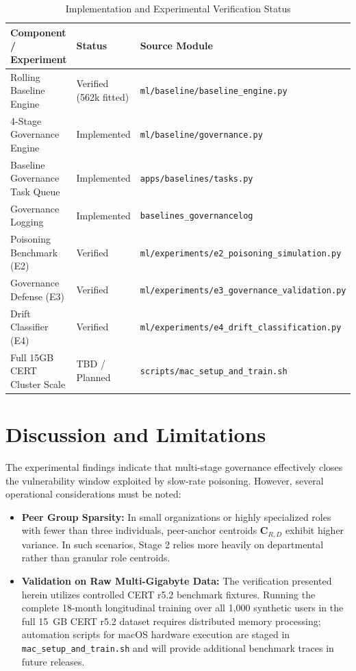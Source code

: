 \documentclass[conference]{IEEEtran}
\begin{document}
\begin{table}[htbp]
\caption{Implementation and Experimental Verification Status}
\label{tab:implementation_status}
\centering
\begin{tabular}{lll}
\toprule
\textbf{Component / Experiment} & \textbf{Status} & \textbf{Source Module} \\
\midrule
Rolling Baseline Engine & Verified (562k fitted) & \texttt{ml/baseline/baseline\_engine.py} \\
4-Stage Governance Engine & Implemented & \texttt{ml/baseline/governance.py} \\
Baseline Governance Task Queue & Implemented & \texttt{apps/baselines/tasks.py} \\
Governance Logging & Implemented & \texttt{baselines\_governancelog} \\
Poisoning Benchmark (E2) & Verified & \texttt{ml/experiments/e2\_poisoning\_simulation.py} \\
Governance Defense (E3) & Verified & \texttt{ml/experiments/e3\_governance\_validation.py} \\
Drift Classifier (E4) & Verified & \texttt{ml/experiments/e4\_drift\_classification.py} \\
Full 15GB CERT Cluster Scale & TBD / Planned & \texttt{scripts/mac\_setup\_and\_train.sh} \\
\bottomrule
\end{tabular}
\end{table}

\section{Discussion and Limitations}
\label{sec:discussion}
The experimental findings indicate that multi-stage governance effectively closes the vulnerability window exploited by slow-rate poisoning. However, several operational considerations must be noted:
\begin{itemize}
    \item \textbf{Peer Group Sparsity:} In small organizations or highly specialized roles with fewer than three individuals, peer-anchor centroids $\mathbf{C}_{R,D}$ exhibit higher variance. In such scenarios, Stage 2 relies more heavily on departmental rather than granular role centroids.
    \item \textbf{Validation on Raw Multi-Gigabyte Data:} The verification presented herein utilizes controlled CERT r5.2 benchmark fixtures. Running the complete 18-month longitudinal training over all 1,000 synthetic users in the full 15~GB CERT r5.2 dataset requires distributed memory processing; automation scripts for macOS hardware execution are staged in \texttt{mac\_setup\_and\_train.sh} and will provide additional benchmark traces in future releases.
\end{itemize}
\end{document}
